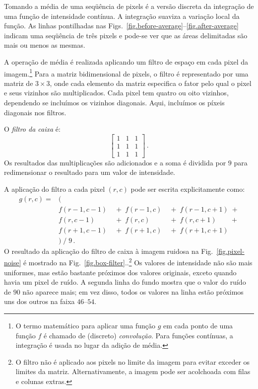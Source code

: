 Tomando a média de uma seqüência de pixels é a versão discreta da integração de uma função de intensidade contínua. A integração suaviza a variação local da função. As linhas pontilhadas nas Figs.~\ref{fig.before-average}--\ref{fig.after-average} indicam uma seqüência de três pixels e pode-se ver que as áreas delimitadas são mais ou menos as mesmas.

A operação de média é realizada aplicando um filtro de espaço em cada pixel da imagem.\footnote{O termo matemático para aplicar uma função $g$ em cada ponto de uma função $f$ é chamado de (discreto) \emph{convolução}. Para funções contínuas, a integração é usada no lugar da adição de média.} Para a matriz bidimensional de pixels, o filtro é representado por uma matriz de $3\times 3$, onde cada elemento da matriz especifica o fator pelo qual o pixel e seus vizinhos são multiplicados. Cada pixel tem quatro ou oito vizinhos, dependendo se incluímos os vizinhos diagonais. Aqui, incluímos os píxeis diagonais nos filtros.

O \emph{filtro da caixa} é:
\[
\left[
\begin{array}{ccc}
1 & 1 & 1\\
1 & 1 & 1\\
1 & 1 & 1
\end{array}
\right]\,.
\]
Os resultados das multiplicações são adicionados e a soma é dividida por $9$ para redimensionar o resultado para um valor de intensidade.

A aplicação do filtro a cada pixel $(r,c)$ pode ser escrita explicitamente como:
\[
\begin{array}{llll}
g(r,c) = &(\\
&f(r-1,c-1) & \;+\; f(r-1,c) & \;+\; f(r-1,c+1) \;+\\
&f(r,c-1) & \;+\; f(r,c) & \;+\; f(r,c+1) \;\;\;\;\;\;\;+\\
&f(r+1,c-1) & \;+\; f(r+1,c) & \;+\; f(r+1,c+1)\\
& ) \; / \; 9\,.
\end{array}
\]
O resultado da aplicação do filtro de caixa à imagem ruidosa na Fig.~\ref{fig.pixel-noise} é mostrado na Fig.~\ref{fig.box-filter}..\footnote{O filtro não é aplicado aos pixels no limite da imagem para evitar exceder os limites da matriz. Alternativamente, a imagem pode ser acolchoada com filas e colunas extras.} Os valores de intensidade não são mais uniformes, mas estão bastante próximos dos valores originais, exceto quando havia um pixel de ruído. A segunda linha do fundo mostra que o valor do ruído de $90$ não aparece mais; em vez disso, todos os valores na linha estão próximos uns dos outros na faixa $46$--$54$.

